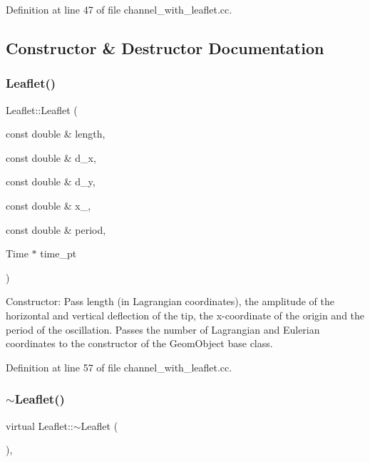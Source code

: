 Definition at line 47 of file channel\+\_\+with\+\_\+leaflet.\+cc.



\subsection{Constructor \& Destructor Documentation}
\mbox{\label{classLeaflet_acb53ccf4578a9981216cf0afd4b38453}} 
\subsubsection{\texorpdfstring{Leaflet()}{Leaflet()}}
{\footnotesize\ttfamily Leaflet\+::\+Leaflet (\begin{DoxyParamCaption}\item[{const double \&}]{length,  }\item[{const double \&}]{d\+\_\+x,  }\item[{const double \&}]{d\+\_\+y,  }\item[{const double \&}]{x\+\_,  }\item[{const double \&}]{period,  }\item[{Time $\ast$}]{time\+\_\+pt }\end{DoxyParamCaption})\hspace{0.3cm}{\ttfamily [inline]}}



Constructor\+: Pass length (in Lagrangian coordinates), the amplitude of the horizontal and vertical deflection of the tip, the x-\/coordinate of the origin and the period of the oscillation. Passes the number of Lagrangian and Eulerian coordinates to the constructor of the Geom\+Object base class. 



Definition at line 57 of file channel\+\_\+with\+\_\+leaflet.\+cc.

\mbox{\label{classLeaflet_a0bbfaeec2534389b203fd2a2316db859}} 
\subsubsection{\texorpdfstring{$\sim$\+Leaflet()}{~Leaflet()}}
{\footnotesize\ttfamily virtual Leaflet\+::$\sim$\+Leaflet (\begin{DoxyParamCaption}{ }\end{DoxyParamCaption})\hspace{0.3cm}{\ttfamily [inline]}, {\ttfamily [virtual]}}



